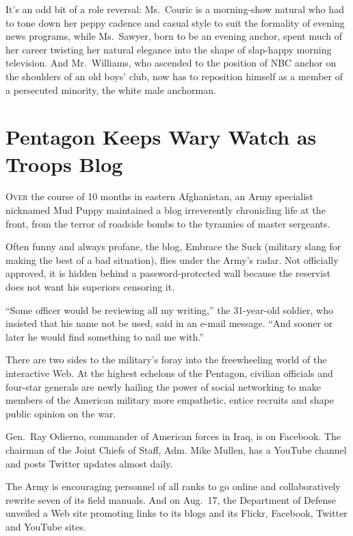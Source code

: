 ﻿\documentclass[12pt]{article}
\begin{document}
It's an odd bit of a role reversal: Ms.~Couric is a morning-show natural who had to tone down her
peppy cadence and casual style to suit the formality of evening news programs, while Ms.~Sawyer,
born to be an evening anchor, spent much of her career twisting her natural elegance into the shape
of slap-happy morning television. And Mr.~Williams, who ascended to the position of NBC anchor on
the shoulders of an old boys' club, now has to reposition himself as a member of a persecuted
minority, the white male anchorman.

\section{Pentagon Keeps Wary Watch as Troops Blog}

\lettrine{O}{ver} the course of 10 months in eastern Afghanistan, an Army specialist nicknamed Mud
Puppy maintained a blog irreverently chronicling\cite{chronicle} life at the front, from the terror
of roadside bombs to the tyrannies of master sergeants.

Often funny and always profane\cite{profane}, the blog, Embrace the Suck (military slang for making
the best of a bad situation), flies under the Army's radar. Not officially approved, it is hidden
behind a password-protected wall because the reservist does not want his superiors censoring it.

``Some officer would be reviewing all my writing,'' the 31-year-old soldier, who insisted that his
name not be used, said in an e-mail message. ``And sooner or later he would find something to nail
me with.''

There are two sides to the military's foray\cite{foray} into the freewheeling world of the
interactive Web. At the highest echelons of the Pentagon, civilian officials and four-star generals
are newly hailing the power of social networking to make members of the American military more
empathetic, entice recruits and shape public opinion on the war.

Gen.~Ray Odierno, commander of American forces in Iraq, is on Facebook. The chairman of the Joint
Chiefs of Staff, Adm. Mike Mullen, has a YouTube channel and posts Twitter updates almost daily.

The Army is encouraging personnel of all ranks to go online and collaboratively rewrite seven of its
field manuals. And on Aug.~17, the Department of Defense unveiled a Web site promoting links to its
blogs and its Flickr, Facebook, Twitter and YouTube sites.
\end{document}
